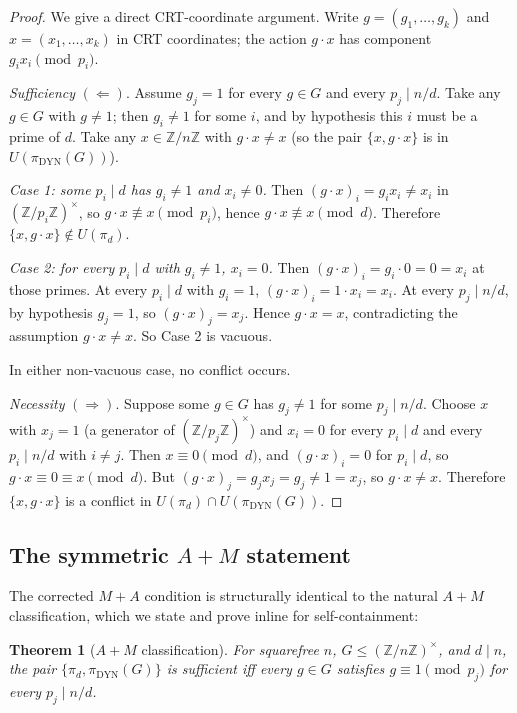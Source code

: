 \documentclass[11pt,reqno]{amsart}
\theoremstyle{plain}
\newtheorem{theorem}{Theorem}
\theoremstyle{definition}
\newcommand{\Z}{\mathbb{Z}}
\newcommand{\Zn}{\Z/n\Z}
\newcommand{\Zns}{(\Z/n\Z)^{\times}}
\newcommand{\DYN}{\mathrm{DYN}}
\begin{document}
\begin{proof}
We give a direct CRT-coordinate argument. Write $g = (g_1,\ldots,g_k)$ and $x = (x_1,\ldots,x_k)$ in CRT coordinates; the action $g \cdot x$ has component $g_i x_i \pmod{p_i}$.

\emph{Sufficiency} $(\Leftarrow)$. Assume $g_j = 1$ for every $g \in G$ and every $p_j \mid n/d$. Take any $g \in G$ with $g \neq 1$; then $g_i \neq 1$ for some $i$, and by hypothesis this $i$ must be a prime of $d$. Take any $x \in \Zn$ with $g \cdot x \neq x$ (so the pair $\{x, g \cdot x\}$ is in $U(\pi_{\DYN}(G))$).

\emph{Case 1: some $p_i \mid d$ has $g_i \neq 1$ and $x_i \neq 0$.} Then $(g \cdot x)_i = g_i x_i \neq x_i$ in $(\Z/p_i\Z)^{\times}$, so $g \cdot x \not\equiv x \pmod{p_i}$, hence $g \cdot x \not\equiv x \pmod d$. Therefore $\{x, g \cdot x\} \notin U(\pi_d)$.

\emph{Case 2: for every $p_i \mid d$ with $g_i \neq 1$, $x_i = 0$.} Then $(g \cdot x)_i = g_i \cdot 0 = 0 = x_i$ at those primes. At every $p_i \mid d$ with $g_i = 1$, $(g \cdot x)_i = 1 \cdot x_i = x_i$. At every $p_j \mid n/d$, by hypothesis $g_j = 1$, so $(g \cdot x)_j = x_j$. Hence $g \cdot x = x$, contradicting the assumption $g \cdot x \neq x$. So Case 2 is vacuous.

In either non-vacuous case, no conflict occurs.

\emph{Necessity} $(\Rightarrow)$. Suppose some $g \in G$ has $g_j \neq 1$ for some $p_j \mid n/d$. Choose $x$ with $x_j = 1$ (a generator of $(\Z/p_j\Z)^{\times}$) and $x_i = 0$ for every $p_i \mid d$ and every $p_i \mid n/d$ with $i \neq j$. Then $x \equiv 0 \pmod d$, and $(g \cdot x)_i = 0$ for $p_i \mid d$, so $g \cdot x \equiv 0 \equiv x \pmod d$. But $(g \cdot x)_j = g_j x_j = g_j \neq 1 = x_j$, so $g \cdot x \neq x$. Therefore $\{x, g \cdot x\}$ is a conflict in $U(\pi_d) \cap U(\pi_{\DYN}(G))$.
\end{proof}

\subsection{The symmetric $A{+}M$ statement}

The corrected $M{+}A$ condition is structurally identical to the natural $A{+}M$ classification, which we state and prove inline for self-containment:

\begin{theorem}[$A{+}M$ classification] \label{thm:AM}
For squarefree $n$, $G \leq \Zns$, and $d \mid n$, the pair $\{\pi_d, \pi_{\DYN}(G)\}$ is sufficient iff every $g \in G$ satisfies $g \equiv 1 \pmod{p_j}$ for every $p_j \mid n/d$.
\end{theorem}
\end{document}
